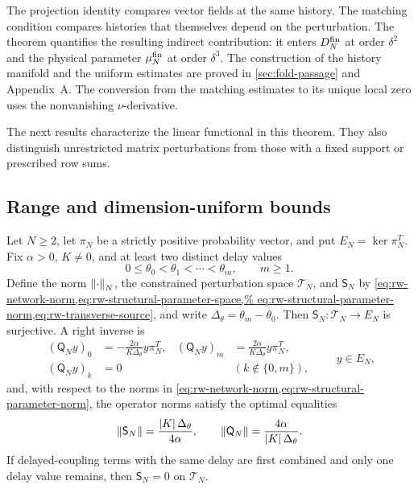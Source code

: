 The projection identity compares vector fields at the same history.  The
matching condition compares histories that themselves depend on the
perturbation.  The theorem quantifies the resulting indirect contribution:
it enters \(D_N^{\rm fin}\) at order \(\delta^2\) and the physical parameter
\(\mu_N^{\rm fin}\) at order \(\delta^3\).  The construction of the history
manifold and the uniform estimates are proved in \cref{sec:fold-passage}
and Appendix~A.  The conversion from the matching estimates to its unique
local zero uses the nonvanishing \(\nu\)-derivative.

The next results characterize the linear functional in this theorem.  They
also distinguish unrestricted matrix perturbations from those with a fixed
support or prescribed row sums.

\subsection{Range and dimension-uniform bounds}

\begin{theorem}
\label{thm:rw-first-moment-map}
Let \(N\ge2\), let \(\pi_N\) be a strictly positive probability vector, and
put \(E_N=\ker\pi_N^T\).  Fix \(\alpha>0\), \(K\ne0\), and at least two
distinct delay values
\[
 0\le \theta_0<\theta_1<\cdots<\theta_m,
 \qquad m\ge1.
\]
Define the norm \(\left\lVert\cdot\right\rVert_N\), the constrained perturbation space
\(\mathcal T_N\), and \(\mathsf S_N\) by
\cref{eq:rw-network-norm,eq:rw-structural-parameter-space,%
eq:rw-structural-parameter-norm,eq:rw-transverse-source},
and write \(\Delta_\theta=\theta_m-\theta_0\).  Then
\(\mathsf S_N:\mathcal T_N\to E_N\) is surjective.  A right
inverse is
\begin{equation}
 \begin{aligned}
  (\mathsf Q_Ny)_0
   &=-\frac{2\alpha}{K\Delta_\theta}y\pi_N^T,
  & (\mathsf Q_Ny)_m
   &= \frac{2\alpha}{K\Delta_\theta}y\pi_N^T,\\
  (\mathsf Q_Ny)_k&=0
  &&(k\notin\{0,m\}),
 \end{aligned}
 \qquad y\in E_N,
 \label{eq:rw-source-right-inverse}
\end{equation}
and, with respect to the norms in
\cref{eq:rw-network-norm,eq:rw-structural-parameter-norm},
the operator norms satisfy the optimal equalities
\begin{equation}
 \left\lVert\mathsf S_N\right\rVert
 =\frac{\left\lvert K\right\rvert\Delta_\theta}{4\alpha},
 \qquad
 \left\lVert\mathsf Q_N\right\rVert
 =\frac{4\alpha}{\left\lvert K\right\rvert\Delta_\theta}.
 \label{eq:rw-source-sharp-norms}
\end{equation}
If delayed-coupling terms with the same delay are first combined and only one
delay value remains, then \(\mathsf S_N=0\) on
\(\mathcal T_N\).
\end{theorem}

